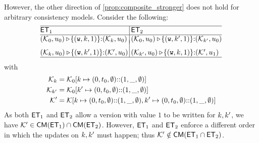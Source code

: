 However, the other direction of \cref{prop:composite_stronger} does not hold for arbitrary consistency models.
Consider the following:
\[
\small
\begin{array}{@{}l @{\hspace{2pt}} | @{\hspace{2pt}} l@{}}
    \hline
    \ET_1 & \ET_2 \\
%    
    \hline
    (\hh_{0}, \vi_{0}) \csat\! \{(\otW, \ke, 1)\} {:} ( \hh_{\ke}, \vi_{0})
    &
    (\hh_{0}, \vi_{0}) \csat\! \{(\otW, \ke', 1)\} {:} ( \hh_{\ke'}, \vi_{0}) 
    \vspace{-5pt}\\\\
%    
    (\hh_{\ke}, \vi_{0}) \csat  \!\{(\otW, \ke', 1)\} {:} (\hh',\vi_{0}) 
    &
    (\hh_{\ke'}, \vi_{0}) \csat \!\{(\otW, \ke, 1)\} {:} (\hh',\vi_{1}) 
    \\
%    
\hline
\end{array}
\]
with 
\begin{align*}
    \mathcal{K}_{k} & = \mathcal{K}_{0}[k \mapsto (0, t_{0}, \emptyset) \mathbb{::} (1, \_, \emptyset)] \\
    \mathcal{K}_{k'} & = \mathcal{K}_{0}[k' \mapsto (0, t_{0}, \emptyset) \mathbb{::} (1, \_, \emptyset)] \\
    \mathcal{K}' & = \mathcal{K}[k \mapsto (0, t_{0}, \emptyset) \mathbb{::} (1, \_, \emptyset) 
                ,k' \mapsto (0, t_{0}, \emptyset) \mathbb{::} (1, \_, \emptyset)] \\
\end{align*}
As both $\mathsf{ET}_1$ and $\mathsf{ET}_2$ allow a version with value $1$ to be written for 
$k, k'$,  we have $\mathcal{K}' \in \mathsf{CM}(\mathsf{ET}_1) \cap \mathsf{CM}(\mathsf{ET}_2)$. 
However, $\mathsf{ET}_1$ and $\mathsf{ET}_2$ enforce a different order in which the updates on $k, k'$ must happen; 
thus $\mathcal{K}' \notin \mathsf{CM}(\mathsf{ET}_1 \cap \mathsf{ET}_2)$. 

